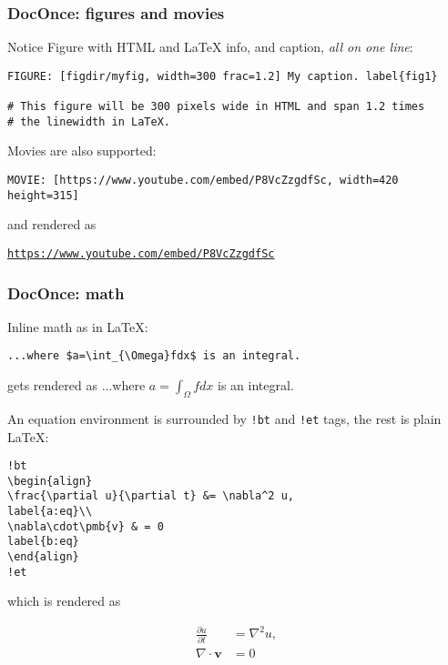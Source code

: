 \documentclass{beamer}
\newenvironment{doconce:movie}{}{}
\newcounter{doconce:movie:counter}
\begin{document}
\begin{frame}
\frametitle{DocOnce: figures and movies}

\begin{block}{Notice}
Figure with HTML and {\LaTeX} info, and caption, \emph{all on one line}:
\end{block}

\begin{Verbatim}[numbers=none,fontsize=\fontsize{9pt}{9pt},baselinestretch=0.95]
FIGURE: [figdir/myfig, width=300 frac=1.2] My caption. label{fig1}

# This figure will be 300 pixels wide in HTML and span 1.2 times
# the linewidth in LaTeX.
\end{Verbatim}

Movies are also supported:

\begin{Verbatim}[numbers=none,fontsize=\fontsize{9pt}{9pt},baselinestretch=0.95]
MOVIE: [https://www.youtube.com/embed/P8VcZzgdfSc, width=420 height=315]
\end{Verbatim}
and rendered as


\begin{doconce:movie}
\begin{center}
\href{{https://www.youtube.com/embed/P8VcZzgdfSc}}{\nolinkurl{https://www.youtube.com/embed/P8VcZzgdfSc}}
\end{center}
\end{doconce:movie}
\end{frame}

\begin{frame}
\frametitle{DocOnce: math}

Inline math as in {\LaTeX}:

\begin{Verbatim}[numbers=none,fontsize=\fontsize{9pt}{9pt},baselinestretch=0.95]
...where $a=\int_{\Omega}fdx$ is an integral.
\end{Verbatim}
gets rendered as ...where $a=\int_{\Omega}fdx$ is an integral.

An equation environment is surrounded by \Verb?!bt? and \Verb?!et? tags,
the rest is plain {\LaTeX}:

\begin{Verbatim}[numbers=none,fontsize=\fontsize{9pt}{9pt},baselinestretch=0.95]
!bt
\begin{align}
\frac{\partial u}{\partial t} &= \nabla^2 u,
label{a:eq}\\
\nabla\cdot\pmb{v} & = 0
label{b:eq}
\end{align}
!et
\end{Verbatim}
which is rendered as

\begin{align}
\frac{\partial u}{\partial t} &= \nabla^2 u,
\label{_a:eq}\\
\nabla\cdot\pmb{v} & = 0
\label{_b:eq}
\end{align}
\end{frame}
\end{document}
